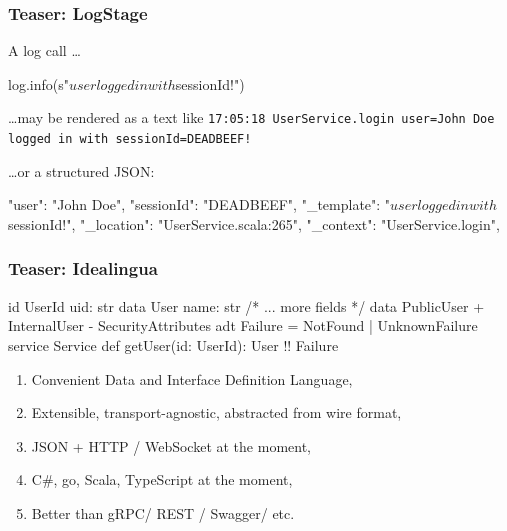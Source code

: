 \documentclass[usenames,dvipsnames]{beamer}
\begin{document}
\begin{frame}[fragile]
\frametitle{Teaser: LogStage}
A log call \dots
\begin{scalacode}
log.info(s"$user logged in with $sessionId!")
\end{scalacode}

\dots may be rendered as a text like \texttt{17:05:18 UserService.login user=John Doe logged in with sessionId=DEADBEEF!}

\dots or a structured JSON:
\begin{jsoncode}
{
  "user": "John Doe",
  "sessionId": "DEADBEEF",
  "_template": "$user logged in with $sessionId!",
  "_location": "UserService.scala:265",
  "_context": "UserService.login",
}
\end{jsoncode}
\end{frame}

\begin{frame}[fragile]
\frametitle{Teaser: Idealingua}
\begin{textcode}
id UserId { uid: str }
data User {  name: str /* ... more fields */ }
data PublicUser {
 + InternalUser
 - SecurityAttributes 
}
adt Failure = NotFound | UnknownFailure
service Service {
  def getUser(id: UserId): User !! Failure
}
\end{textcode}

\begin{enumerate}
\item Convenient Data and Interface Definition Language,
\item Extensible, transport-agnostic, abstracted from wire format,
\item JSON + HTTP / WebSocket at the moment,
\item C\#, go, Scala, TypeScript at the moment,
\item Better than gRPC/ REST / Swagger/ etc.
\end{enumerate}
\end{frame}
\end{document}
